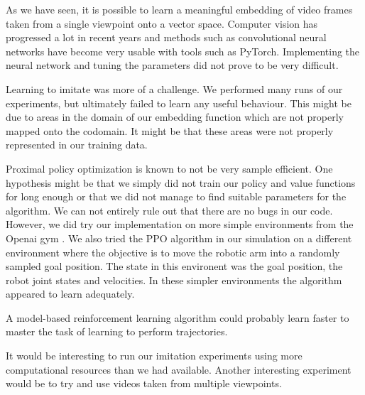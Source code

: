 
As we have seen, it is possible to learn a meaningful embedding of video frames taken from a single viewpoint onto a vector space. Computer vision has progressed a lot in recent years and methods such as convolutional neural networks have become very usable with tools such as PyTorch. Implementing the neural network and tuning the parameters did not prove to be very difficult.

Learning to imitate was more of a challenge. We performed many runs of our experiments, but ultimately failed to learn any useful behaviour. This might be due to areas in the domain of our embedding function which are not properly mapped onto the codomain. It might be that these areas were not properly represented in our training data.

Proximal policy optimization is known to not be very sample efficient. One hypothesis might be that we simply did not train our policy and value functions for long enough or that we did not manage to find suitable parameters for the algorithm. We can not entirely rule out that there are no bugs in our code. However, we did try our implementation on more simple environments from the Openai gym \citep{gym}. We also tried the PPO algorithm in our simulation on a different environment where the objective is to move the robotic arm into a randomly sampled goal position. The state in this environent was the goal position, the robot joint states and velocities. In these simpler environments the algorithm appeared to learn adequately.

A model-based reinforcement learning algorithm could probably learn faster to master the task of learning to perform trajectories.

It would be interesting to run our imitation experiments using more computational resources than we had available. Another interesting experiment would be to try and use videos taken from multiple viewpoints.


